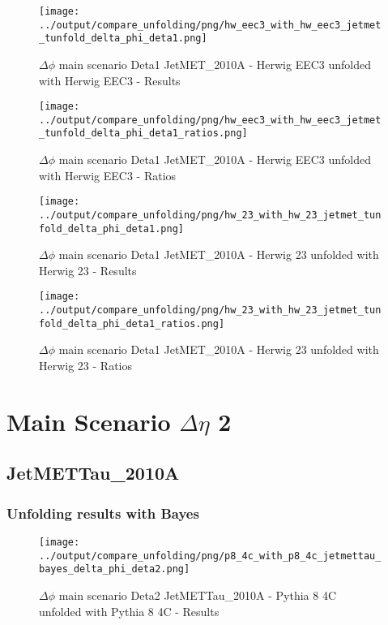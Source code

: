 \documentclass[11pt]{book}
\begin{document}
\begin{figure}[ht]
\centering
\texttt{[image: ../output/compare\_unfolding/png/hw\_eec3\_with\_hw\_eec3\_jetmet\_tunfold\_delta\_phi\_deta1.png]}
\caption{$\Delta\phi$ main scenario Deta1 JetMET\_2010A - Herwig EEC3 unfolded with Herwig EEC3 - Results}
\label{hw_eec3_hw_eec3_jetmet_tunfold_delta_phi_deta1_a}
\end{figure}

\begin{figure}[ht]
\centering
\texttt{[image: ../output/compare\_unfolding/png/hw\_eec3\_with\_hw\_eec3\_jetmet\_tunfold\_delta\_phi\_deta1\_ratios.png]}
\caption{$\Delta\phi$ main scenario Deta1 JetMET\_2010A - Herwig EEC3 unfolded with Herwig EEC3 - Ratios}
\label{hw_eec3_hw_eec3_jetmet_tunfold_delta_phi_deta1_b}
\end{figure}

\begin{figure}[ht]
\centering
\texttt{[image: ../output/compare\_unfolding/png/hw\_23\_with\_hw\_23\_jetmet\_tunfold\_delta\_phi\_deta1.png]}
\caption{$\Delta\phi$ main scenario Deta1 JetMET\_2010A - Herwig 23 unfolded with Herwig 23 - Results}
\label{hw_23_hw_23_jetmet_tunfold_delta_phi_deta1_a}
\end{figure}

\begin{figure}[ht]
\centering
\texttt{[image: ../output/compare\_unfolding/png/hw\_23\_with\_hw\_23\_jetmet\_tunfold\_delta\_phi\_deta1\_ratios.png]}
\caption{$\Delta\phi$ main scenario Deta1 JetMET\_2010A - Herwig 23 unfolded with Herwig 23 - Ratios}
\label{hw_23_hw_23_jetmet_tunfold_delta_phi_deta1_b}
\end{figure}


\clearpage
\chapter{Main Scenario $\Delta\eta$ 2 }
\section{JetMETTau\_2010A}
\subsection{Unfolding results with Bayes}

\begin{figure}[ht]
\centering
\texttt{[image: ../output/compare\_unfolding/png/p8\_4c\_with\_p8\_4c\_jetmettau\_bayes\_delta\_phi\_deta2.png]}
\caption{$\Delta\phi$ main scenario Deta2 JetMETTau\_2010A - Pythia 8 4C unfolded with Pythia 8 4C - Results}
\label{p8_p8_jetmettau_bayes_delta_phi_deta2_a}
\end{figure}
\end{document}

